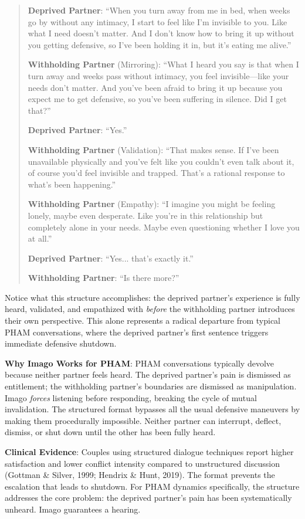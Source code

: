 \documentclass[12pt,openany]{book}
\numberwithin{equation}{chapter}
\begin{document}
\begin{quote}
\textbf{Deprived Partner}: ``When you turn away from me in bed, when weeks go by without any intimacy, I start to feel like I'm invisible to you. Like what I need doesn't matter. And I don't know how to bring it up without you getting defensive, so I've been holding it in, but it's eating me alive.''

\textbf{Withholding Partner} (Mirroring): ``What I heard you say is that when I turn away and weeks pass without intimacy, you feel invisible---like your needs don't matter. And you've been afraid to bring it up because you expect me to get defensive, so you've been suffering in silence. Did I get that?''

\textbf{Deprived Partner}: ``Yes.''

\textbf{Withholding Partner} (Validation): ``That makes sense. If I've been unavailable physically and you've felt like you couldn't even talk about it, of course you'd feel invisible and trapped. That's a rational response to what's been happening.''

\textbf{Withholding Partner} (Empathy): ``I imagine you might be feeling lonely, maybe even desperate. Like you're in this relationship but completely alone in your needs. Maybe even questioning whether I love you at all.''

\textbf{Deprived Partner}: ``Yes... that's exactly it.''

\textbf{Withholding Partner}: ``Is there more?''
\end{quote}

Notice what this structure accomplishes: the deprived partner's experience is fully heard, validated, and empathized with \textit{before} the withholding partner introduces their own perspective. This alone represents a radical departure from typical PHAM conversations, where the deprived partner's first sentence triggers immediate defensive shutdown.

\textbf{Why Imago Works for PHAM}: PHAM conversations typically devolve because neither partner feels heard. The deprived partner's pain is dismissed as entitlement; the withholding partner's boundaries are dismissed as manipulation. Imago \textit{forces} listening before responding, breaking the cycle of mutual invalidation. The structured format bypasses all the usual defensive maneuvers by making them procedurally impossible. Neither partner can interrupt, deflect, dismiss, or shut down until the other has been fully heard.

\textbf{Clinical Evidence}: Couples using structured dialogue techniques report higher satisfaction and lower conflict intensity compared to unstructured discussion (Gottman \& Silver, 1999; Hendrix \& Hunt, 2019). The format prevents the escalation that leads to shutdown. For PHAM dynamics specifically, the structure addresses the core problem: the deprived partner's pain has been systematically unheard. Imago guarantees a hearing.
\end{document}

